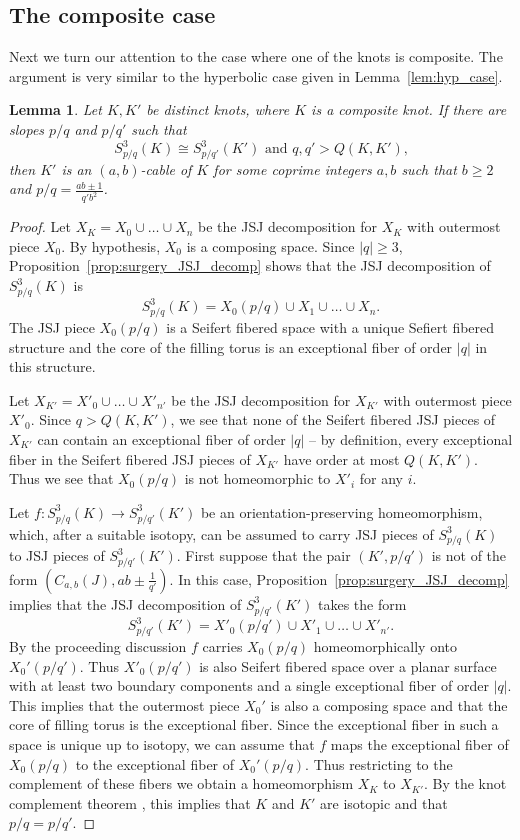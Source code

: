 \documentclass{amsart} %
\theoremstyle{thm}
\newtheorem{lem}[Theorem]{Lemma}
\theoremstyle{definition}
\numberwithin{equation}{section}
\begin{document}
\subsection{The composite case}
Next we turn our attention to the case where one of the knots is composite. The argument is very similar to the hyperbolic case given in Lemma~\ref{lem:hyp_case}.
\begin{lem}\label{lem:composite_case}
Let $K, K'$ be distinct knots, where $K$ is a composite knot. If there are slopes $p/q$ and $p/q'$ such that
\[
\text{$S_{p/q}^3(K)\cong S_{p/q'}^3(K')$ and $q,q'> Q(K,K')$,}
\]
then $K'$ is an $(a,b)$-cable of $K$ for some coprime integers $a,b$ such that $b\geq 2$ and $p/q = \frac{ab\pm 1}{q'b^2}$.
\end{lem}
\begin{proof}
Let $X_K=X_0 \cup \dots \cup X_n$ be the JSJ decomposition for $X_K$ with outermost piece $X_0$. By hypothesis, $X_0$ is a composing space. Since $|q|\geq 3$, Proposition~\ref{prop:surgery_JSJ_decomp} shows that the JSJ decomposition of $S_{p/q}^3(K)$ is
\[
S_{p/q}^3(K)=X_0(p/q) \cup X_1\cup \dots \cup X_n.
\]
The JSJ piece $X_0(p/q)$ is a Seifert fibered space with a unique Sefiert fibered structure and the core of the filling torus is an exceptional fiber of order $|q|$ in this structure.

Let $X_{K'}=X'_0 \cup \dots \cup X'_{n'}$ be the JSJ decomposition for $X_{K'}$ with outermost piece $X'_0$. Since $q> Q(K,K')$, we see that none of the Seifert fibered JSJ pieces of $X_{K'}$ can contain an exceptional fiber of order $|q|$ -- by definition, every exceptional fiber in the Seifert fibered JSJ pieces of $X_{K'}$ have order at most $Q(K,K')$. Thus we see that $X_0(p/q)$ is not homeomorphic to $X'_i$ for any $i$.

Let $f\colon S_{p/q}^3(K) \rightarrow S_{p/q'}^3(K')$ be an orientation-preserving homeomorphism, which, after a suitable isotopy, can be assumed to carry JSJ pieces of $S_{p/q}^3(K)$ to JSJ pieces of $S_{p/q'}^3(K')$. First suppose that the pair $(K',p/q')$ is not of the form $(C_{a,b}(J), ab\pm \frac{1}{q'})$. In this case, Proposition~\ref{prop:surgery_JSJ_decomp} implies that the JSJ decomposition of $S_{p/q'}^3(K')$ takes the form
\[
S_{p/q'}^3(K')=X'_0(p/q') \cup X'_1 \cup \dots \cup X'_{n'}.
\]
By the proceeding discussion $f$ carries $X_0(p/q)$ homeomorphically onto $X_0'(p/q')$. Thus $X'_0(p/q')$ is also Seifert fibered space over a planar surface with at least two boundary components and a single exceptional fiber of order $|q|$. This implies that the outermost piece $X_0'$ is also a composing space and that the core of filling torus is the exceptional fiber. Since the exceptional fiber in such a space is unique up to isotopy, we can assume that $f$ maps the exceptional fiber of $X_0(p/q)$ to the exceptional fiber of $X_0'(p/q)$. Thus restricting to the complement of these fibers we obtain a homeomorphism $X_K$ to $X_{K'}$. By the knot complement theorem \cite{GL89}, this implies that $K$ and $K'$ are isotopic and that $p/q=p/q'$. 


\end{proof}
\end{document}
